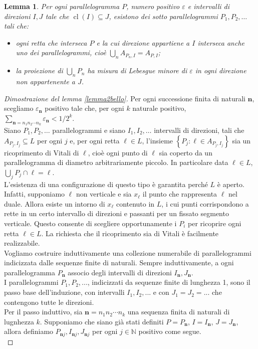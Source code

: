 \documentclass[a4paper, twoside,openright]{article}
\newcommand{\<}{\langle}
\renewcommand{\>}{\rangle}
\newtheorem{lemma}[teo]{Lemma}
\begin{document}
\begin{lemma} \label{lemmabrutto}
Per ogni parallelogramma $P$, numero positivo $\varepsilon$ e intervalli di direzioni $I, J$ tale che $\operatorname{cl}(I) \subseteq J$, esistono dei sotto parallelogrammi $P_{1}, P_{2}, \ldots$ tali che:
\begin{itemize}
	\item ogni retta che interseca $P$ e la cui direzione appartiene a $I$ interseca anche uno dei parallelogrammi, cioè $\bigcup_{n} A_{P_{n}, I}=A_{P, I}$;
	\item la proiezione di $\bigcup_{n} P_{n}$ ha misura di Lebesgue minore di $\varepsilon$ in ogni direzione non appartenente a $J$.
\end{itemize}
\end{lemma}

\begin{proof}[Dimostrazione del lemma \ref{lemma2bello}]
Per ogni successione finita di naturali $\mathbf{n}$, scegliamo $\varepsilon_{\mathbf{n}}$ positivo tale che, per ogni $k$ naturale positivo, $\sum_{\mathbf{n}=n_{1} n_{2} \cdots n_{k}} \varepsilon_{\mathbf{n}}<1 / 2^{k}$.\\
Siano $P_{1}, P_{2}, \ldots$ parallelogrammi e siano $I_{1}, I_{2}, \ldots$ intervalli di direzioni, tali che $A_{P_{j}, I_{j}} \subseteq L$ per ogni $j$ e, per ogni retta $\ell \in L$, l'insieme $\left\{P_{j}: \ell \in A_{P_{j}, I_{j}}\right\}$ sia un ricoprimento di Vitali di $\ell$, cioè ogni punto di $\ell$ sia coperto da un parallelogramma di diametro arbitrariamente piccolo. In particolare data $\ell \in L$, $ \bigcup_j P_j \cap \ell = \ell $.\\
L'esistenza di una configurazione di questo tipo è garantita perché $L$ è aperto. Infatti, supponiamo $\ell$ non verticale e sia $x_{\ell}$ il punto che rappresenta $\ell$ nel duale. Allora esiste un intorno di $x_{\ell}$ contenuto in $L$, i cui punti corrispondono a rette in un certo intervallo di direzioni e passanti per un fissato segmento verticale. Questo consente di scegliere opportunamente i $P_i$ per ricoprire ogni retta $\ell \in L$. La richiesta che il ricoprimento sia di Vitali è facilmente realizzabile.\\

Vogliamo costruire induttivamente una collezione numerabile di parallelogrammi indicizzata dalle sequenze finite di naturali. Sempre induttivamente, a ogni parallelogramma $P_{\mathbf{n}}$ associo degli intervalli di direzioni $I_{\mathbf{n}}, J_{\mathbf{n}}$.\\
I parallelogrammi $P_1, P_2,...$, indicizzati da sequenze finite di lunghezza 1, sono il passo base dell'induzione, con intervalli $I_1, I_2,...$ e con $J_1=J_2=...$ che contengono tutte le direzioni.\\
Per il passo induttivo, sia $\mathbf{n}=n_{1} n_{2} \cdots n_{k}$ una sequenza finita di naturali di lugnhezza $k$. Supponiamo che siano già stati definiti $P=P_{\mathbf{n}}$, $I=I_{\mathbf{n}}$, $J=J_{\mathbf{n}}$, allora definiamo $P_{\mathbf{n} j}, I_{\mathbf{n} j}, J_{\mathbf{n} j}$ per ogni $j \in \mathbb{N}$ positivo come segue.\\


\end{proof}
\end{document}
